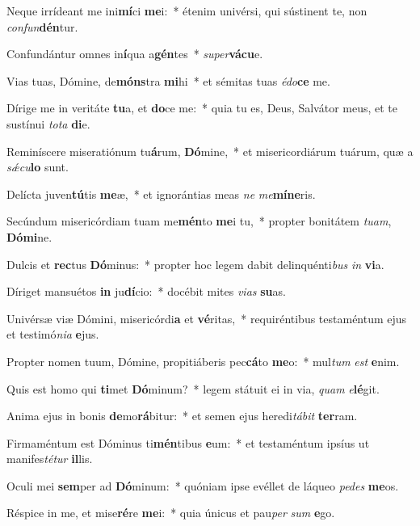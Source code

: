 \item Neque irrídeant me ini\textbf{mí}ci \textbf{me}i:~* étenim univérsi, qui sústinent te, non \textit{con}\textit{fun}\textbf{dén}tur.
\item Confundántur omnes in\textbf{í}qua a\textbf{gén}tes~* \textit{su}\textit{per}\textbf{vá}\textbf{cu}e.
\item Vias tuas, Dómine, de\textbf{móns}tra \textbf{mi}hi~* et sémitas tuas \textit{é}\textit{do}\textbf{ce} me.
\item Dírige me in veritáte \textbf{tu}a, et \textbf{do}ce me:~* quia tu es, Deus, Salvátor meus, et te sustínui \textit{to}\textit{ta} \textbf{di}e.
\item Reminíscere miseratiónum tu\textbf{á}rum, \textbf{Dó}mine,~* et misericordiárum tuárum, quæ a \textit{sǽ}\textit{cu}\textbf{lo} sunt.
\item Delícta juven\textbf{tú}tis \textbf{me}æ,~* et ignorántias meas \textit{ne} \textit{me}\textbf{mí}\textbf{ne}ris.
\item Secúndum misericórdiam tuam me\textbf{mén}to \textbf{me}i tu,~* propter bonitátem \textit{tu}\textit{am}, \textbf{Dó}\textbf{mi}ne.
\item Dulcis et \textbf{rec}tus \textbf{Dó}minus:~* propter hoc legem dabit delinquénti\textit{bus} \textit{in} \textbf{vi}a.
\item Díriget mansuétos \textbf{in} ju\textbf{dí}cio:~* docébit mites \textit{vi}\textit{as} \textbf{su}as.
\item Univérsæ viæ Dómini, misericórdi\textbf{a} et \textbf{vé}ritas,~* requiréntibus testaméntum ejus et testimó\textit{ni}\textit{a} \textbf{e}jus.
\item Propter nomen tuum, Dómine, propitiáberis pec\textbf{cá}to \textbf{me}o:~* mul\textit{tum} \textit{est} \textbf{e}nim.
\item Quis est homo qui \textbf{ti}met \textbf{Dó}minum?~* legem státuit ei in via, \textit{quam} \textit{e}\textbf{lé}git.
\item Anima ejus in bonis \textbf{de}mo\textbf{rá}bitur:~* et semen ejus heredi\textit{tá}\textit{bit} \textbf{ter}ram.
\item Firmaméntum est Dóminus ti\textbf{mén}tibus \textbf{e}um:~* et testaméntum ipsíus ut manifes\textit{té}\textit{tur} \textbf{il}lis.
\item Oculi mei \textbf{sem}per ad \textbf{Dó}minum:~* quóniam ipse evéllet de láqueo \textit{pe}\textit{des} \textbf{me}os.
\item Réspice in me, et mise\textbf{ré}re \textbf{me}i:~* quia únicus et pau\textit{per} \textit{sum} \textbf{e}go.
